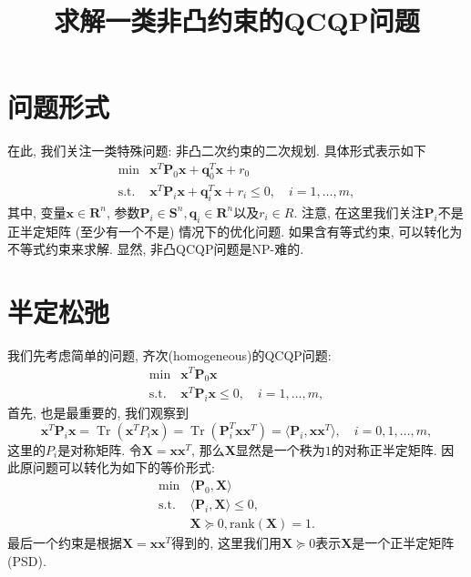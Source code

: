 \documentclass[a4paper,12pt]{article}
\DeclareMathOperator{\Tr}{Tr}
\begin{document}
\title{求解一类非凸约束的QCQP问题}
\maketitle



\section{问题形式}
在此, 我们关注一类特殊问题: 非凸二次约束的二次规划.
具体形式表示如下
\begin{equation} \label{equ:nonconvex QCQP}
\begin{array}{cl}
{\min}  & {\bm{x}^T \bm{P}_0 \bm{x} + \bm{q}_0^T \bm{x} + r_0} \\
{\text{s.t.}} & {\bm{x}^T \bm{P}_i \bm{x} + \bm{q}_i^T \bm{x} + r_i \leq 0, \quad i = 1,\dots,m},
\end{array}
\end{equation}
其中, 变量$\bm{x} \in \bm{R}^n$, 参数$\bm{P}_i \in \bm{S}^n, \bm{q}_i \in \bm{R}^n$以及$r_i \in R$.
注意, 在这里我们关注$\bm{P}_i$不是正半定矩阵 (至少有一个不是) 情况下的优化问题.
如果含有等式约束, 可以转化为不等式约束来求解.
显然, 非凸QCQP问题是NP-难的.

\section{半定松弛}
我们先考虑简单的问题, 齐次(homogeneous)的QCQP问题: 
\begin{equation}
\begin{array}{cl}
{\min} & {\bm{x}^T \bm{P}_0 \bm{x}} \\
{\text{s.t.}} & {\bm{x}^T \bm{P}_i \bm{x} \leq 0, \quad i = 1,\dots,m},
\end{array}
\end{equation}
首先, 也是最重要的, 我们观察到
\begin{equation}
\bm{x}^T \bm{P}_i \bm{x} = \Tr(\bm{x}^T P_i \bm{x}) = \Tr(\bm{P}_i^T \bm{x} \bm{x}^T) = \langle \bm{P}_i, \bm{x} \bm{x}^T \rangle,\quad i=0,1,\dots,m,
\end{equation}
这里的$P_i$是对称矩阵.
令$\bm{X} = \bm{x}\bm{x}^T$, 那么$\bm{X}$显然是一个秩为$1$的对称正半定矩阵.
因此原问题可以转化为如下的等价形式:
\begin{equation}
\begin{array}{cl}
{\min} & {\langle \bm{P}_0, \bm{X} \rangle} \\
{\text{s.t.}} & {\langle \bm{P}_i, \bm{X} \rangle \leq 0}, \\
{} & {\bm{X} \succeq 0, \text{rank}(\bm{X}) = 1}.
\end{array}
\end{equation}
最后一个约束是根据$\bm{X} = \bm{x}\bm{x}^T$得到的, 这里我们用$\bm{X} \succeq 0$表示$\bm{X}$是一个正半定矩阵(PSD).
\end{document}
